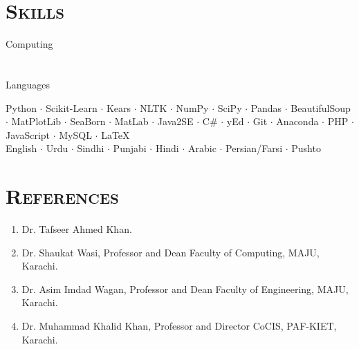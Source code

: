 \documentclass[a4paper, 10pt]{article}
\begin{document}
\section*{\normalfont\textsc{Skills}}
\hfill\begin{minipage}{0.17\textwidth}
Computing\textcolor{lightgray}{\dotfill}\\\\\\
Languages\textcolor{lightgray}{\dotfill}
\end{minipage}%
\begin{minipage}{0.8\textwidth}
Python $\cdot$ Scikit-Learn $\cdot$ Kears $\cdot$ NLTK $\cdot$ NumPy  $\cdot$ SciPy $\cdot$ Pandas $\cdot$ BeautifulSoup $\cdot$ MatPlotLib $\cdot$ SeaBorn $\cdot$ MatLab $\cdot$ Java2SE $\cdot$ C\# $\cdot$ yEd $\cdot$ Git $\cdot$ Anaconda $\cdot$ PHP $\cdot$ JavaScript $\cdot$ MySQL $\cdot$ \LaTeX\\
English $\cdot$ Urdu $\cdot$ Sindhi $\cdot$ Punjabi $\cdot$ Hindi $\cdot$ Arabic $\cdot$ Persian/Farsi $\cdot$ Pushto 
\end{minipage}

\section*{\normalfont\textsc{References}}
\begin{enumerate}
\itemsep-4pt
 \item Dr. Tafseer Ahmed Khan.
 \item Dr. Shaukat Wasi, Professor and Dean Faculty of Computing, MAJU, Karachi.
 \item Dr. Asim Imdad Wagan, Professor and Dean Faculty of Engineering, MAJU, Karachi.
 \item Dr. Muhammad Khalid Khan, Professor and Director CoCIS, PAF-KIET, Karachi.
\end{enumerate}
\end{document}
